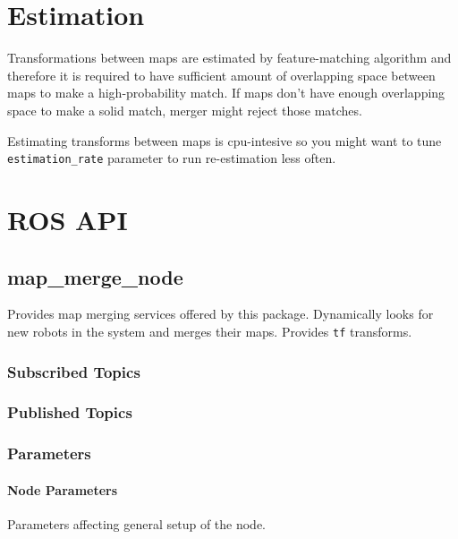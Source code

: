 \section{Estimation}

Transformations between maps are estimated by feature-matching algorithm and therefore it is required to have sufficient amount of overlapping space between maps to make a high-probability match. If maps don't have enough overlapping space to make a solid match, merger might reject those matches.

Estimating transforms between maps is cpu-intesive so you might want to tune \texttt{estimation\_rate} parameter to run re-estimation less often.

\section{ROS API}

\subsection{map\_merge\_node}

Provides map merging services offered by this package. Dynamically looks for new robots in the system and merges their maps. Provides \texttt{tf} transforms.

\subsubsection{Subscribed Topics}


\subsubsection{Published Topics}


\subsubsection{Parameters}
\paragraph{Node Parameters}

Parameters affecting general setup of the node.

